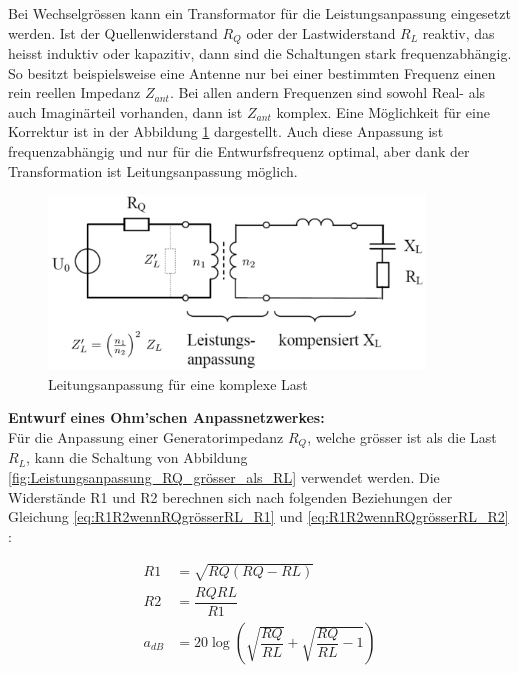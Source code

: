 Bei Wechselgrössen kann ein Transformator für die Leistungsanpassung eingesetzt werden. Ist der Quellenwiderstand $R_Q$ oder der Lastwiderstand $R_L$  reaktiv, das heisst induktiv oder kapazitiv, dann sind die Schaltungen stark frequenzabhängig. So besitzt beispielsweise eine Antenne nur bei einer bestimmten Frequenz einen rein reellen Impedanz $Z_{ant}$. Bei allen andern Frequenzen sind sowohl Real- als auch Imaginärteil vorhanden, dann ist $Z_{ant}$ komplex. Eine Möglichkeit für eine Korrektur ist in der Abbildung \ref{AnpassungKomplexerLast} dargestellt. Auch diese  Anpassung ist frequenzabhängig und nur für die Entwurfsfrequenz optimal, aber dank der Transformation ist Leitungsanpassung möglich.
\begin{figure}[!h]
	\centering
	\includegraphics[width=10cm]{content/bilder/AnpassungKomplexerLast.pdf}%
	\caption{Leitungsanpassung für eine komplexe Last \cite{Tekom}}
	\label{AnpassungKomplexerLast}
\end{figure}
\newpage
\textbf{Entwurf eines Ohm’schen Anpassnetzwerkes:} \\
Für die Anpassung einer Generatorimpedanz $R_Q$, welche grösser ist als die Last $R_L$, kann die Schaltung von Abbildung \ref{fig:Leistungsanpassung_RQ_grösser_als_RL} verwendet werden. Die Widerstände R1 und R2 berechnen sich nach folgenden Beziehungen der Gleichung \ref{eq:R1R2wennRQgrösserRL_R1} und \ref{eq:R1R2wennRQgrösserRL_R2} \cite{Tekom}:

	\begin{align}
		R1 &= \sqrt{RQ(RQ-RL)} \label{eq:R1R2wennRQgrösserRL_R1} \\
		R2 &= \dfrac{RQ RL}{R1} \label{eq:R1R2wennRQgrösserRL_R2} \\
		a_{dB} &= 20\log \left( \sqrt{\dfrac{RQ}{RL}}+\sqrt{\dfrac{RQ}{RL}-1}\right)
	\end{align}

